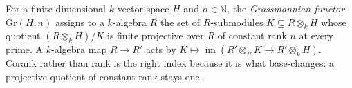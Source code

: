 \begin{definition}
  \label{def:grFunctorAff}
  \leanok
  For a finite-dimensional \(k\)-vector space \(H\) and \(n \in \mathbb{N}\), the
  \emph{Grassmannian functor} \(\mathrm{Gr}(H, n)\) assigns to a \(k\)-algebra \(R\) the set
  of \(R\)-submodules \(K \subseteq R \otimes_k H\) whose quotient \((R \otimes_k H)/K\) is
  finite projective over \(R\) of constant rank \(n\) at every prime. A \(k\)-algebra map
  \(R \to R'\) acts by \(K \mapsto \operatorname{im}(R' \otimes_R K \to R' \otimes_k H)\).
  Corank rather than rank is the right index because it is what base-changes: a projective
  quotient of constant rank stays one.
\end{definition}

